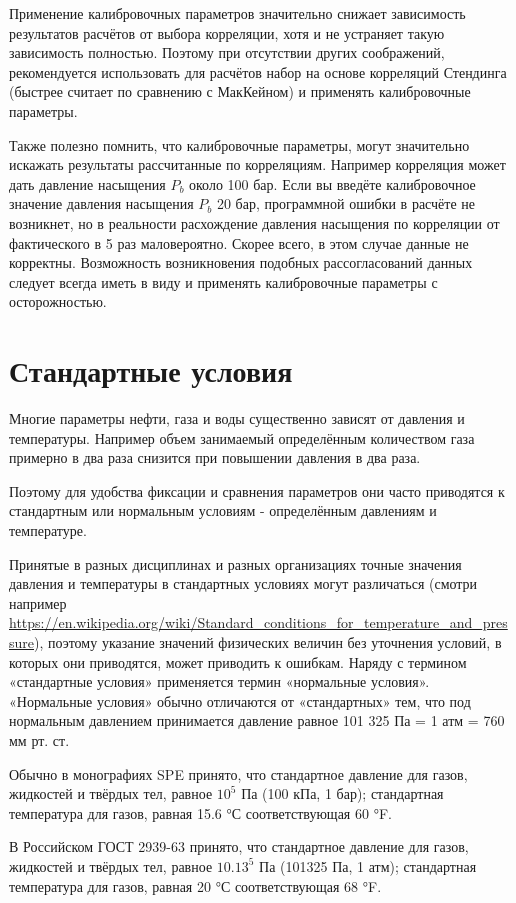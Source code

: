 Применение калибровочных параметров значительно снижает зависимость результатов расчётов от выбора корреляции, хотя и не устраняет такую зависимость полностью. Поэтому при отсутствии других соображений, рекомендуется использовать для расчётов набор на основе корреляций Стендинга (быстрее считает по сравнению с МакКейном) и применять калибровочные параметры.

Также полезно помнить, что калибровочные параметры, могут значительно искажать результаты рассчитанные по корреляциям. Например корреляция может дать давление насыщения $P_b$ около 100 бар. Если вы введёте калибровочное значение давления насыщения $P_b$ 20 бар, программной ошибки в расчёте не возникнет, но в реальности расхождение давления насыщения по корреляции от фактического в 5 раз маловероятно. Скорее всего, в этом случае данные не корректны. Возможность возникновения подобных рассогласований данных следует всегда иметь в виду и применять калибровочные параметры с осторожностью.  

\section{Стандартные условия} 
Многие параметры нефти, газа и воды существенно зависят от давления и температуры. Например объем занимаемый определённым количеством газа примерно в два раза снизится при повышении давления в два раза. 

Поэтому для удобства фиксации и сравнения параметров они часто приводятся к стандартным или нормальным условиям - определённым давлениям и температуре. 
	
	Принятые в разных дисциплинах и разных организациях точные значения давления и температуры в стандартных условиях могут различаться (смотри например \url{https://en.wikipedia.org/wiki/Standard_conditions_for_temperature_and_pressure}), поэтому указание значений физических величин без уточнения условий, в которых они приводятся, может приводить к ошибкам. Наряду с термином «стандартные условия» применяется термин «нормальные условия». «Нормальные условия» обычно отличаются от «стандартных» тем, что под нормальным давлением принимается давление равное 101 325 Па = 1 атм = 760 мм рт. ст.
	
	Обычно в монографиях SPE принято, что стандартное давление для газов, жидкостей и твёрдых тел, равное $10^5$ Па (100 кПа, 1 бар); стандартная температура для газов, равная 15.6 °С соответствующая 60 °F. 
	
	В Российском ГОСТ 2939-63  принято, что стандартное давление для газов, жидкостей и твёрдых тел, равное $10.13^5$ Па (101325 Па, 1 атм); стандартная температура для газов, равная 20 °С соответствующая 68 °F. 
	
